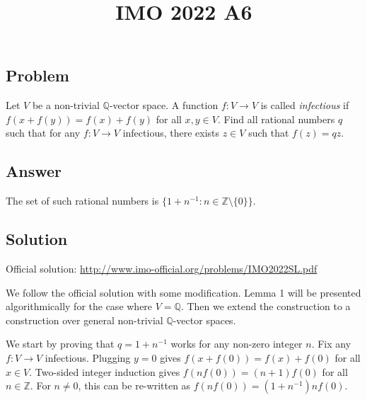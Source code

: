 \documentclass{article}
\title{IMO 2022 A6}
\author{}
\date{}
\newcommand{\Q}{\mathbb{Q}}
\newcommand{\Z}{\mathbb{Z}}
\begin{document}
\maketitle



\subsection*{Problem}

Let $V$ be a non-trivial $\Q$-vector space.
A function $f : V \to V$ is called \emph{infectious} if $f(x + f(y)) = f(x) + f(y)$ for all $x, y \in V$.
Find all rational numbers $q$ such that for any $f : V \to V$ infectious, there exists $z \in V$ such that $f(z) = qz$.



\subsection*{Answer}

The set of such rational numbers is $\{1 + n^{-1} : n \in \Z \setminus \{0\}\}$.



\subsection*{Solution}

Official solution: \url{http://www.imo-official.org/problems/IMO2022SL.pdf}

We follow the official solution with some modification.
Lemma 1 will be presented algorithmically for the case where $V = \Q$.
Then we extend the construction to a construction over general non-trivial $\Q$-vector spaces.

We start by proving that $q = 1 + n^{-1}$ works for any non-zero integer $n$.
Fix any $f : V \to V$ infectious.
Plugging $y = 0$ gives $f(x + f(0)) = f(x) + f(0)$ for all $x \in V$.
Two-sided integer induction gives $f(n f(0)) = (n + 1) f(0)$ for all $n \in \Z$.
For $n \neq 0$, this can be re-written as $f(n f(0)) = (1 + n^{-1}) n f(0)$.
\end{document}
